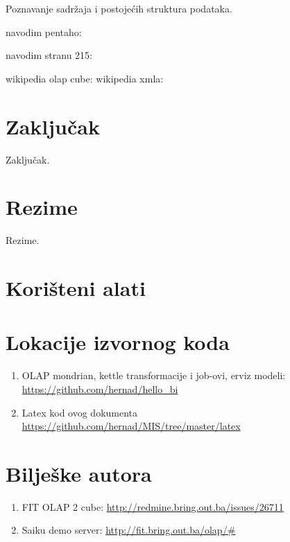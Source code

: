 \documentclass[times, utf8, seminar]{fit}
\begin{document}
Poznavanje sadržaja i postojećih struktura podataka.





navodim pentaho: \cite{pentaho32}

navodim stranu 215: \cite[str.~215]{pentaho32}

wikipedia olap cube: \cite{web:wikipedia:olap_cube}
wikipedia xmla: \cite{web:wikipedia:xmla}

\chapter{Zaključak}
Zaključak.




\chapter{Rezime}
Rezime.

\appendix

\chapter{Korišteni alati}

\chapter{Lokacije izvornog koda}


\begin{enumerate}[labelindent=\parindent,leftmargin=*]
   \item OLAP mondrian, kettle transformacije i job-ovi, erviz modeli: \url{https://github.com/hernad/hello_bi}
   \item Latex kod ovog dokumenta \url{https://github.com/hernad/MIS/tree/master/latex}
\end{enumerate}

\chapter{Bilješke autora}

\begin{enumerate}
  \item FIT OLAP 2 cube: \url{http://redmine.bring.out.ba/issues/26711}
  \item Saiku demo server: \url{http://fit.bring.out.ba/olap/#}
\end{enumerate}
\end{document}
